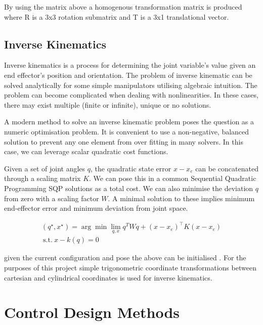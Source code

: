 \documentclass{UoNMCHA}
\numberwithin{equation}{section}
\begin{document}
	By using the matrix above a homogenous transformation matrix is produced where R is a 3x3 rotation submatrix and T is a 3x1 translational vector. 
	
	\newpage
	\subsection{Inverse Kinematics}
	
	Inverse kinematics is a process for determining the joint variable's value given an end effector's position and orientation. The problem of inverse kinematic can be solved analytically for some simple manipulators utilising algebraic intuition. The problem can become complicated when dealing with nonlinearities. In these cases, there may exist multiple (finite or infinite), unique or no solutions. \par
	A modern method to solve an inverse kinematic problem poses the question as a numeric optimisation problem. It is convenient to use a non-negative, balanced solution to prevent any one element from over fitting in many solvers. In this case, we can leverage scalar quadratic cost functions.  \par
	Given a set of joint angles $ q $, the quadratic state error  $x-x_e$ can be concatenated through a scaling matrix $ K $. We can pose this in a common Sequential Quadratic Programming SQP solutions as a total cost. We can also minimise the deviation $ q $ from zero with a scaling factor $ W $. A minimal solution to these implies minimum end-effector error and minimum deviation from joint space.  
	
	
	
	\begin{gather*}
	\left(q^\star,x^\star\right)=\arg{\min \lim_{q,x}{q^{T}W}q}+\left(x-x_e\right)^\top K\left(x-x_e\right) \\
	\mathrm{\ s.t.\ }x-k\left(q\right)=0
	\end{gather*}
	
	given the current configuration and pose the above can be initialised \cite{renton_mcha4000}. For the purposes of this project simple trigonometric coordinate transformations between cartesian and cylindrical coordinates is used for inverse kinematics.
	
	
	
	\section{Control Design Methods}
	
\end{document}
